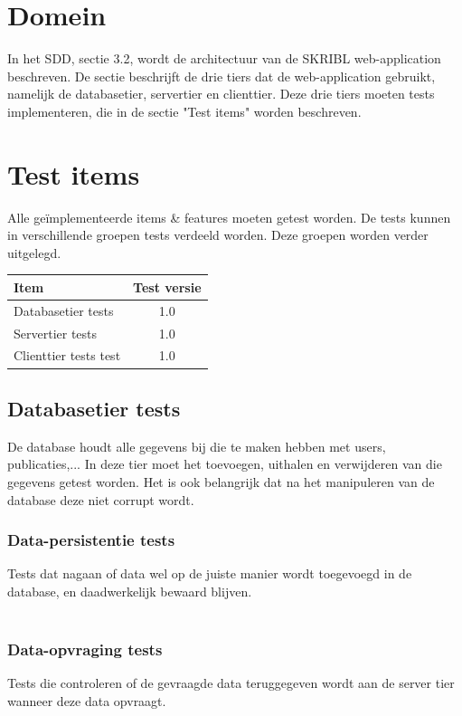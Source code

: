 \documentclass{article}
\begin{document}
\section{Domein}
In het SDD, sectie 3.2, wordt de architectuur van de SKRIBL web-application beschreven. De sectie beschrijft de drie tiers dat de web-application gebruikt, namelijk de databasetier, servertier en clienttier. Deze drie tiers moeten tests implementeren, die in de sectie "Test items" worden beschreven.

\section{Test items}

Alle ge\"implementeerde items \& features moeten getest worden. De tests kunnen in verschillende groepen tests verdeeld worden. Deze groepen worden verder uitgelegd.

\begin{table}[h]
\begin{tabular}{l | c }
 Item&Test versie\\
 \hline
 Databasetier tests&1.0\\
 Servertier tests&1.0\\
 Clienttier tests test&1.0\\
\end{tabular}
\end{table}

\subsection{Databasetier tests}
De database houdt alle gegevens bij die te maken hebben met users, publicaties,... In deze tier moet het toevoegen, uithalen en verwijderen van die gegevens getest worden. Het is ook belangrijk dat na het manipuleren van de database deze niet corrupt wordt.

\subsubsection{Data-persistentie tests}
Tests dat nagaan of data wel op de juiste manier wordt toegevoegd in de database, en daadwerkelijk bewaard blijven.
\\
\\
\subsubsection{Data-opvraging tests}
Tests die controleren of de gevraagde data teruggegeven wordt aan de server tier wanneer deze data opvraagt.
\\
\\
\end{document}

